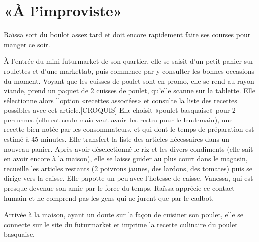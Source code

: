 \section{«À l'improviste»}

Raïssa sort du boulot assez tard et doit encore rapidement faire ses courses pour manger ce soir.
\par
À l'entrée du mini-futurmarket de son quartier, elle se saisit d'un petit panier sur roulettes et d'une markettab, puis commence par y consulter les bonnes occasions du moment.
Voyant que les cuisses de poulet sont en promo, elle se rend au rayon viande, prend un paquet de 2 cuisses de poulet, qu'elle scanne sur la tablette.
Elle sélectionne alors l'option «recettes associées» et consulte la liste des recettes possibles avec cet article.[CROQUIS]
Elle choisit «poulet basquaise» pour 2 personnes (elle est seule mais veut avoir des restes pour le lendemain), une recette bien notée par les consommateurs, et qui dont le temps de préparation est estimé à 45 minutes.
Elle transfert la liste des articles nécessaires dans un nouveau panier.
Après avoir déselectionné le riz et les divers condiments (elle sait en avoir encore à la maison), elle se laisse guider au plus court dans le magasin, recueille les articles restants (2 poivrons jaunes, des lardons, des tomates) puis se dirige vers la caisse.
Elle papotte un peu avec l'hotesse de caisse, Vanessa, qui est presque devenue son amie par le force du temps. 
Raïssa apprécie ce contact humain et ne comprend pas les gens qui ne jurent que par le cadbot.
\par
Arrivée à la maison, ayant un doute sur la façon de cuisiner son poulet, elle se connecte sur le site du futurmarket et imprime la recette culinaire du poulet basquaise.
